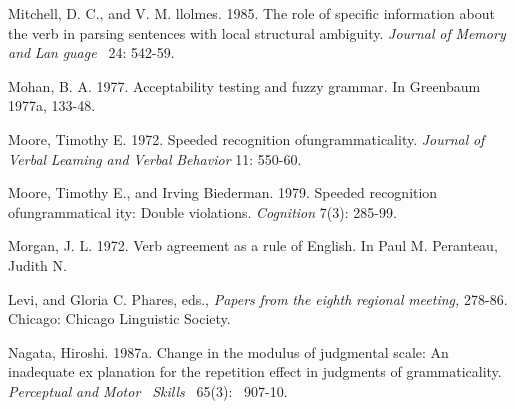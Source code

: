 \begin{styleStandard}
Mitchell, D. C., and V. M. llolmes. 1985. The role of specific information about the verb in parsing sentences with local structural ambiguity. \textit{Journal}\textit{ }\textit{of}\textit{ }\textit{Memory and}\textit{ }\textit{Lan\-}\textit{ }\textit{guage }\textit{\ }24: 542-59.
\end{styleStandard}


\begin{styleStandard}
Mohan, B. A. 1977. Acceptability testing and fuzzy grammar. In Greenbaum 1977a, 133{\textquotesingle}-48.
\end{styleStandard}


\begin{styleStandard}
Moore, Timothy E. 1972. Speeded recognition ofungrammaticality. \textit{Journal}\textit{ }\textit{of}\textit{ }\textit{Verbal}\textit{ }\textit{Leaming}\textit{ }\textit{and}\textit{ }\textit{Verbal}\textit{ }\textit{Behavior}\textit{ }11: 550-60.
\end{styleStandard}


\begin{styleStandard}
Moore, Timothy E., and Irving Biederman. 1979. Speeded recognition ofungrammatical\- ity: Double violations. \textit{Cognition}\textit{ }7(3): 285-99.
\end{styleStandard}


\begin{styleStandard}
Morgan, J. L. 1972. Verb agreement as a rule of English. In Paul M. Peranteau, Judith N.
\end{styleStandard}


\begin{styleStandard}
Levi, and Gloria C. Phares, eds., \textit{Papers}\textit{ }\textit{from}\textit{ }\textit{the}\textit{ }\textit{eighth}\textit{ }\textit{regional}\textit{ }\textit{meeting,}\textit{ }278-86. Chicago: Chicago Linguistic Society.
\end{styleStandard}


\begin{styleStandard}
Nagata, Hiroshi. 1987a. Change in the modulus of judgmental scale: An inadequate ex\- planation for the repetition effect in judgments of grammaticality. \textit{Perceptual}\textit{ }\textit{and}\textit{ }\textit{Motor }\textit{\ }\textit{Skills }\textit{\ }65(3): \ 907-10.
\end{styleStandard}


